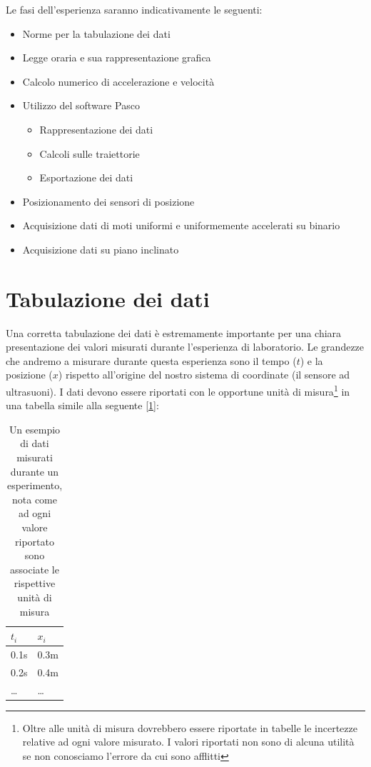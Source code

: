\documentclass[a4paper,10pt,oneside]{article}
\begin{document}
Le fasi dell'esperienza saranno indicativamente le seguenti:
\begin{itemize}
 \item Norme per la tabulazione dei dati
 \item Legge oraria e sua rappresentazione grafica
 \item Calcolo numerico di accelerazione e velocità
 \item Utilizzo del software Pasco
 \begin{itemize}
   \item Rappresentazione dei dati
   \item Calcoli sulle traiettorie
   \item Esportazione dei dati
 \end{itemize}
\item Posizionamento dei sensori di posizione
\item Acquisizione dati di moti uniformi e uniformemente accelerati su binario
\item Acquisizione dati su piano inclinato
\end{itemize}

\section{Tabulazione dei dati}

Una corretta tabulazione dei dati è estremamente importante per una chiara presentazione dei valori misurati durante l'esperienza di laboratorio. Le grandezze che andremo a misurare durante questa esperienza sono il tempo ($t$) e la posizione ($x$) rispetto all'origine del nostro sistema di coordinate (il sensore ad ultrasuoni). I dati devono essere riportati con le opportune unità di misura\footnote{Oltre alle unità di misura dovrebbero essere riportate in tabelle le incertezze relative ad ogni valore misurato. I valori riportati non sono di alcuna utilità se non conosciamo l'errore da cui sono afflitti} in una tabella simile alla seguente [\ref{tab:extab1}]:
\begin{table}[H]
\begin{center}
\begin{tabular}{ll}\toprule
$t_i$ & $x_i$\\ \midrule
0.1s & 0.3m\\
0.2s & 0.4m\\
\ldots &\ldots \\ \bottomrule
\end{tabular}\caption{Un esempio di dati misurati durante un esperimento, nota come ad ogni valore riportato sono associate le rispettive unità di misura}\label{tab:extab1}
\end{center}
\end{table}
\end{document}
